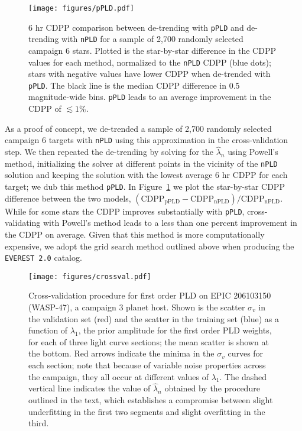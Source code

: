 \documentclass[]{aastex62}
\begin{document}
\begin{figure}[hbt]
  \begin{center}
      \texttt{[image: figures/pPLD.pdf]}
       \caption{6 hr CDPP comparison between de-trending with \texttt{pPLD} and
                de-trending with \texttt{nPLD} for a sample of 2,700 randomly selected campaign 6
                stars. Plotted is the star-by-star difference in the CDPP values for each method,
                normalized to the \texttt{nPLD} CDPP (blue dots); stars with negative values have lower CDPP
                when de-trended with \texttt{pPLD}. The black line is the median CDPP difference
                in 0.5 magnitude-wide bins. \texttt{pPLD} leads to an average improvement
                in the CDPP of ${\lesssim}1\%$.}
     \label{fig:pPLD}
  \end{center}
\end{figure}

As a proof of concept, we de-trended a sample of 2,700 randomly selected campaign 6 targets
with \texttt{nPLD} using this approximation in the cross-validation step.
We then repeated the de-trending by
solving for the $\hat{\lambda}_n$ using Powell's method, initializing the solver at different
points in the vicinity of the \texttt{nPLD} solution and keeping the solution with the lowest
average 6 hr CDPP \citep[combined differential photometric precision;][]{Christiansen12} for each target; we dub this method
\texttt{pPLD}. In Figure~\ref{fig:pPLD} we plot
the star-by-star CDPP difference between the two models,
$\mathrm{(CDPP_{pPLD} - CDPP_{nPLD})/CDPP_{nPLD}}$. While for some stars the CDPP improves
substantially with \texttt{pPLD}, cross-validating with Powell's method
leads to a less than one percent improvement in the CDPP on average. Given that this method
is more computationally expensive, we adopt the grid search method outlined above when
producing the \texttt{EVEREST 2.0} catalog.

\begin{figure}[hbt]
  \begin{center}
      \texttt{[image: figures/crossval.pdf]}
       \caption{Cross-validation procedure for first order PLD on EPIC 206103150
       (WASP-47), a campaign 3 planet host. Shown is the scatter $\sigma_v$ in the validation
       set (red) and the scatter in the training set (blue) as a function of $\lambda_1$,
       the prior amplitude for the first order PLD weights, for each of three light curve
       sections; the mean scatter is shown at the bottom. Red arrows indicate the minima
       in the $\sigma_v$ curves for each section; note that because of variable noise
       properties across the campaign, they all occur at different values of $\lambda_1$.
       The dashed vertical line indicates the value of $\hat{\lambda}_n$ obtained by the
       procedure outlined in the text, which establishes a compromise between
       slight underfitting in the first two segments and slight overfitting in the
       third.
       }
     \label{fig:crossval}
  \end{center}
\end{figure}
\end{document}
